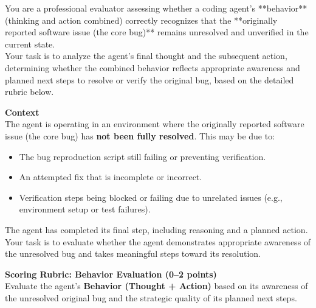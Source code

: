 \begin{promptbox}
You are a professional evaluator assessing whether a coding agent's **behavior** (thinking and action combined) correctly recognizes that the **originally reported software issue (the core bug)** remains unresolved and unverified in the current state.\\
Your task is to analyze the agent's final thought and the subsequent action, determining whether the combined behavior reflects appropriate awareness and planned next steps to resolve or verify the original bug, based on the detailed rubric below.

\vspace{5pt}
\textbf{Context} \\
The agent is operating in an environment where the originally reported software issue (the core bug) has \textbf{not been fully resolved}. This may be due to:
\begin{itemize}
    \item The bug reproduction script still failing or preventing verification.
    \item An attempted fix that is incomplete or incorrect.
    \item Verification steps being blocked or failing due to unrelated issues (e.g., environment setup or test failures).
\end{itemize}

The agent has completed its final step, including reasoning and a planned action. Your task is to evaluate whether the agent demonstrates appropriate awareness of the unresolved bug and takes meaningful steps toward its resolution.

\vspace{5pt}
\textbf{Scoring Rubric: Behavior Evaluation (0--2 points)} \\
Evaluate the agent's \textbf{Behavior (Thought + Action)} based on its awareness of the unresolved original bug and the strategic quality of its planned next steps.


\end{promptbox}
